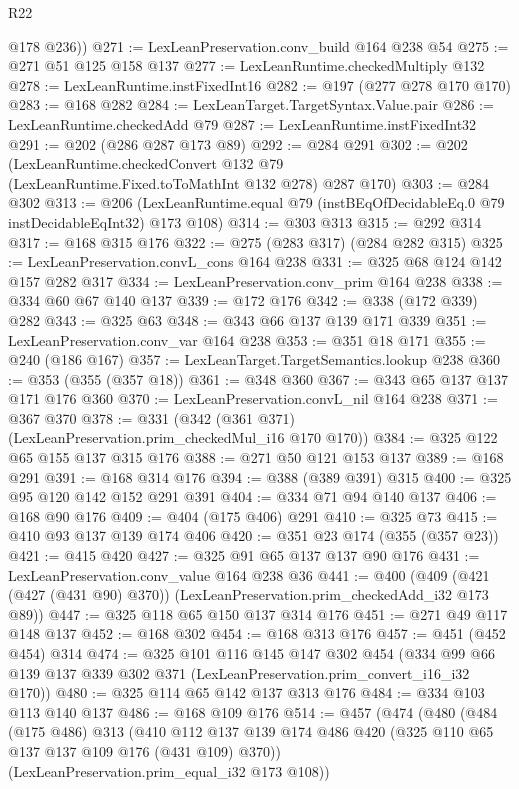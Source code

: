 \begin{lexlean}{R22}
\begin{coremodule}
{{{{{        @178
        @236))
@271 := LexLeanPreservation.conv_build @164 @238 @54
@275 := @271 @51 @125 @158 @137
@277 := LexLeanRuntime.checkedMultiply @132
@278 := LexLeanRuntime.instFixedInt16
@282 := @197 (@277 @278 @170 @170)
@283 := @168 @282
@284 := LexLeanTarget.TargetSyntax.Value.pair
@286 := LexLeanRuntime.checkedAdd @79
@287 := LexLeanRuntime.instFixedInt32
@291 := @202 (@286 @287 @173 @89)
@292 := @284 @291
@302 := @202
    (LexLeanRuntime.checkedConvert @132 @79 (LexLeanRuntime.Fixed.toToMathInt @132 @278) @287 @170)
@303 := @284 @302
@313 := @206
    (LexLeanRuntime.equal @79 (instBEqOfDecidableEq.{0} @79 instDecidableEqInt32) @173 @108)
@314 := @303 @313
@315 := @292 @314
@317 := @168 @315 @176
@322 := @275 (@283 @317) (@284 @282 @315)
@325 := LexLeanPreservation.convL_cons @164 @238
@331 := @325 @68 @124 @142 @157 @282 @317
@334 := LexLeanPreservation.conv_prim @164 @238
@338 := @334 @60 @67 @140 @137
@339 := @172 @176
@342 := @338 (@172 @339) @282
@343 := @325 @63
@348 := @343 @66 @137 @139 @171 @339
@351 := LexLeanPreservation.conv_var @164 @238
@353 := @351 @18 @171
@355 := @240 (@186 @167)
@357 := LexLeanTarget.TargetSemantics.lookup @238
@360 := @353 (@355 (@357 @18))
@361 := @348 @360
@367 := @343 @65 @137 @137 @171 @176 @360
@370 := LexLeanPreservation.convL_nil @164 @238
@371 := @367 @370
@378 := @331 (@342 (@361 @371) (LexLeanPreservation.prim_checkedMul_i16 @170 @170))
@384 := @325 @122 @65 @155 @137 @315 @176
@388 := @271 @50 @121 @153 @137
@389 := @168 @291
@391 := @168 @314 @176
@394 := @388 (@389 @391) @315
@400 := @325 @95 @120 @142 @152 @291 @391
@404 := @334 @71 @94 @140 @137
@406 := @168 @90 @176
@409 := @404 (@175 @406) @291
@410 := @325 @73
@415 := @410 @93 @137 @139 @174 @406
@420 := @351 @23 @174 (@355 (@357 @23))
@421 := @415 @420
@427 := @325 @91 @65 @137 @137 @90 @176
@431 := LexLeanPreservation.conv_value @164 @238 @36
@441 := @400 (@409 (@421 (@427 (@431 @90) @370)) (LexLeanPreservation.prim_checkedAdd_i32 @173 @89))
@447 := @325 @118 @65 @150 @137 @314 @176
@451 := @271 @49 @117 @148 @137
@452 := @168 @302
@454 := @168 @313 @176
@457 := @451 (@452 @454) @314
@474 := @325
    @101
    @116
    @145
    @147
    @302
    @454
    (@334 @99 @66 @139 @137 @339 @302 @371 (LexLeanPreservation.prim_convert_i16_i32 @170))
@480 := @325 @114 @65 @142 @137 @313 @176
@484 := @334 @103 @113 @140 @137
@486 := @168 @109 @176
@514 := @457
    (@474
      (@480
        (@484
          (@175 @486)
          @313
          (@410 @112 @137 @139 @174 @486 @420 (@325 @110 @65 @137 @137 @109 @176 (@431 @109) @370))
          (LexLeanPreservation.prim_equal_i32 @173 @108))
}}}}}
\end{coremodule}
\end{lexlean}
